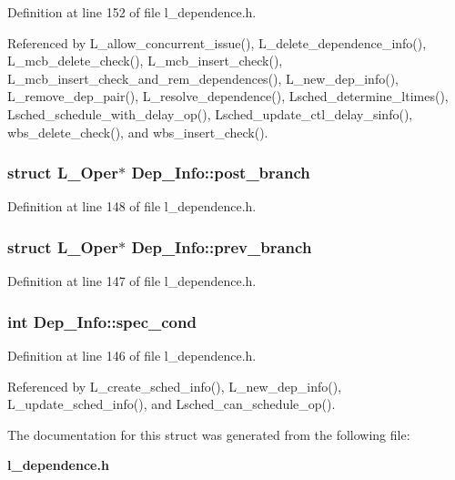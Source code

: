 Definition at line 152 of file l\_\-dependence.h.

Referenced by L\_\-allow\_\-concurrent\_\-issue(), L\_\-delete\_\-dependence\_\-info(), L\_\-mcb\_\-delete\_\-check(), L\_\-mcb\_\-insert\_\-check(), L\_\-mcb\_\-insert\_\-check\_\-and\_\-rem\_\-dependences(), L\_\-new\_\-dep\_\-info(), L\_\-remove\_\-dep\_\-pair(), L\_\-resolve\_\-dependence(), Lsched\_\-determine\_\-ltimes(), Lsched\_\-schedule\_\-with\_\-delay\_\-op(), Lsched\_\-update\_\-ctl\_\-delay\_\-sinfo(), wbs\_\-delete\_\-check(), and wbs\_\-insert\_\-check().
\subsubsection{\setlength{\rightskip}{0pt plus 5cm}struct L\_\-Oper$\ast$ \bf{Dep\_\-Info::post\_\-branch}}\label{structDep__Info_2f25629154a32c7e7f5ea22e46085988}




Definition at line 148 of file l\_\-dependence.h.
\subsubsection{\setlength{\rightskip}{0pt plus 5cm}struct L\_\-Oper$\ast$ \bf{Dep\_\-Info::prev\_\-branch}}\label{structDep__Info_c4f5448637f2af44a2a059dc489f551d}




Definition at line 147 of file l\_\-dependence.h.
\subsubsection{\setlength{\rightskip}{0pt plus 5cm}int \bf{Dep\_\-Info::spec\_\-cond}}\label{structDep__Info_f9027196bbcd05436d9ad94078f2c468}




Definition at line 146 of file l\_\-dependence.h.

Referenced by L\_\-create\_\-sched\_\-info(), L\_\-new\_\-dep\_\-info(), L\_\-update\_\-sched\_\-info(), and Lsched\_\-can\_\-schedule\_\-op().

The documentation for this struct was generated from the following file:\begin{CompactItemize}
\item 
\bf{l\_\-dependence.h}\end{CompactItemize}
